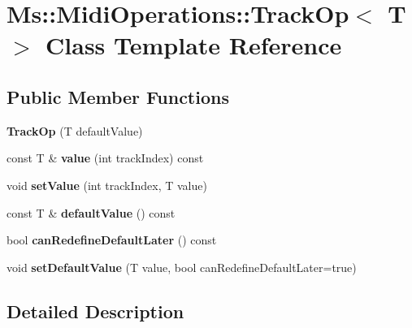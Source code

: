 \hypertarget{class_ms_1_1_midi_operations_1_1_track_op}{}\section{Ms\+:\+:Midi\+Operations\+:\+:Track\+Op$<$ T $>$ Class Template Reference}
\label{class_ms_1_1_midi_operations_1_1_track_op}
\subsection*{Public Member Functions}
\begin{DoxyCompactItemize}
\item 
\mbox{\label{class_ms_1_1_midi_operations_1_1_track_op_ab6aa3c9fee50dea8184338cbb5a034e1}} 
{\bfseries Track\+Op} (T default\+Value)
\item 
\mbox{\label{class_ms_1_1_midi_operations_1_1_track_op_a27fd20f89bd4ce52f9483177dae4710a}} 
const T \& {\bfseries value} (int track\+Index) const
\item 
\mbox{\label{class_ms_1_1_midi_operations_1_1_track_op_aaaf695db42db7e4237743c3210cd7a29}} 
void {\bfseries set\+Value} (int track\+Index, T value)
\item 
\mbox{\label{class_ms_1_1_midi_operations_1_1_track_op_a3fd1e39d7b2ed103b02fbeb665ec6b34}} 
const T \& {\bfseries default\+Value} () const
\item 
\mbox{\label{class_ms_1_1_midi_operations_1_1_track_op_a7f9def9347800a7c193880c2303236c8}} 
bool {\bfseries can\+Redefine\+Default\+Later} () const
\item 
\mbox{\label{class_ms_1_1_midi_operations_1_1_track_op_a8d1d98ff2679e8143a1364f1d6d7f867}} 
void {\bfseries set\+Default\+Value} (T value, bool can\+Redefine\+Default\+Later=true)
\end{DoxyCompactItemize}


\subsection{Detailed Description}
